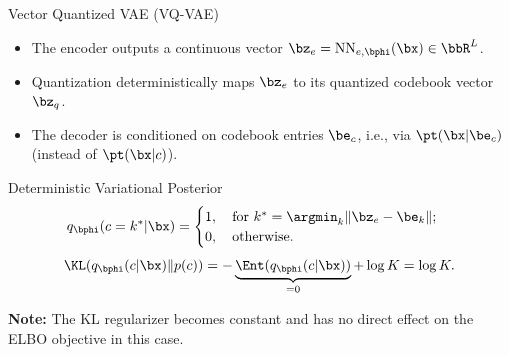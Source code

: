 \documentclass{beamer}
\begin{document}
\begin{frame}{Vector Quantized VAE (VQ-VAE)}
	\begin{itemize}
		\item The encoder outputs a continuous vector $\bz_e = \text{NN}_{e, \bphi}(\bx) \in \bbR^{L}$.
		\item Quantization deterministically maps $\bz_e$ to its quantized codebook vector $\bz_q$.
		\item The decoder is conditioned on codebook entries $\be_c$, i.e., via $\pt(\bx | \be_c)$ (instead of $\pt(\bx| c)$).
	\end{itemize}
    \eqpause
	\begin{block}{Deterministic Variational Posterior}
		\vspace{-0.3cm}
		\[
			q_{\bphi}(c = k^* | \bx) = \begin{cases}
				1 , \quad \text{for } k^* = \argmin_k \| \bz_e - \be_k \|; \\
				0, \quad \text{otherwise}.
		\end{cases}
		\]
        \eqpause
		\[
			\KL(q_{\bphi}(c| \bx) \| p(c)) = - \underbrace{\Ent(q_{\bphi}(c| \bx))}_{=0} + \log K = \log K. 
		\]
        \eqpause
	\end{block}	
	\vspace{-0.4cm}
	\textbf{Note:} The KL regularizer becomes constant and has no direct effect on the ELBO objective in this case.
\end{frame}
\end{document}
